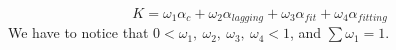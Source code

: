 \documentclass{article}
\begin{document}
\begin{CJK}{UTF8}{gbsn}
\begin{equation}
K=\omega_1\alpha_c+\omega_2\alpha_{lagging}+\omega_3\alpha_{fit}+\omega_4\alpha_{fitting}
\end{equation}
We have to notice that $0<\omega_1,~\omega_2,~\omega_3,~\omega_4<1$, and $\sum{\omega_1}=1$.
\end{CJK}
\end{document}
